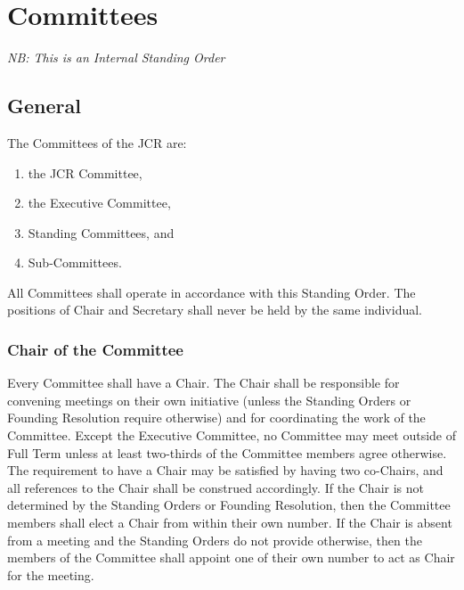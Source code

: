 \chapter{Committees}
\hspace*{-10pt}\textit{NB: This is an Internal Standing Order}
\section{General}
\npara The Committees of the JCR are:
\begin{enumerate}
	\item the JCR Committee,
	\item the Executive Committee,
	\item Standing Committees, and
	\item Sub-Committees.
\end{enumerate}
\npara All Committees shall operate in accordance with this Standing Order.
\npara The positions of Chair and Secretary shall never be held by the same individual.
\subsection{Chair of the Committee}
\npara Every Committee shall have a Chair.
The Chair shall be responsible for convening meetings on their own initiative (unless the Standing Orders or Founding Resolution require otherwise) and for coordinating the work of the Committee.
Except the Executive Committee, no Committee may meet outside of Full Term unless at least two-thirds of the Committee members agree otherwise.
\npara The requirement to have a Chair may be satisfied by having two co-Chairs, and all references to the Chair shall be construed accordingly.
\npara If the Chair is not determined by the Standing Orders or Founding Resolution, then the Committee members shall elect a Chair from within their own number.
\npara If the Chair is absent from a meeting and the Standing Orders do not provide otherwise, then the members of the Committee shall appoint one of their own number to act as Chair for the meeting.
